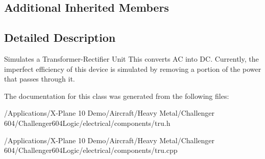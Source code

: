 \subsection*{Additional Inherited Members}


\subsection{Detailed Description}
Simulates a Transformer-\/\-Rectifier Unit This converts A\-C into D\-C. Currently, the imperfect efficiency of this device is simulated by removing a portion of the power that passes through it. 

The documentation for this class was generated from the following files\-:\begin{DoxyCompactItemize}
\item 
/\-Applications/\-X-\/\-Plane 10 Demo/\-Aircraft/\-Heavy Metal/\-Challenger 604/\-Challenger604\-Logic/electrical/components/tru.\-h\item 
/\-Applications/\-X-\/\-Plane 10 Demo/\-Aircraft/\-Heavy Metal/\-Challenger 604/\-Challenger604\-Logic/electrical/components/tru.\-cpp\end{DoxyCompactItemize}
